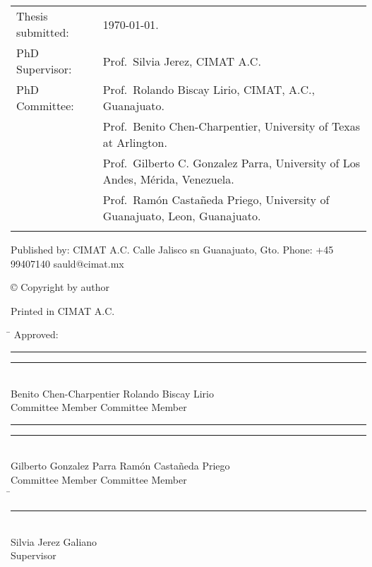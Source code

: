 \thispagestyle{empty}
\noindent
\begin{tabularx}{\textwidth}{@{}lX}
    Thesis submitted:	& \today.\\
    PhD Supervisor:		& Prof.\ Silvia Jerez, CIMAT A.C.\\
    PhD Committee:		& Prof.\ Rolando Biscay Lirio, CIMAT, A.C., Guanajuato. \\
					    & Prof.\ Benito Chen-Charpentier, University of Texas at Arlington.\\
					    & Prof.\ Gilberto C. Gonzalez Parra,
					    University of Los Andes, M\'erida, Venezuela.\\						
						& Prof.\ Ram\'on Casta\~{n}eda Priego, University of Guanajuato, Leon, Guanajuato.\\
						 \\
\end{tabularx}
\strut\vfill
\noindent
	\noindent Published by:\newline
	CIMAT A.C. \newline
	Calle Jalisco sn\newline
	Guanajuato, Gto.\newline
	Phone: +45 99407140\newline
	sauld@cimat.mx\newline
	\strut\vfill
	\noindent \copyright{} Copyright by author\newline
	\strut\vfill
	\noindent Printed in CIMAT A.C. 
	\strut\vfill\vfill\vfill
	\clearpage

\begin{tabbing}
	\mbox{\hspace{95mm}}\= \kill
	\huge{Approved}: \\[1.5in]
	\rule{60mm}{.1mm}          \> \rule{60mm}{.1mm}    \\
	Benito Chen-Charpentier     \>  Rolando Biscay Lirio           \\
	Committee Member           \>  Committee Member    \\[1.5in]	
	\rule{60mm}{.1mm}          \>  \rule{60mm}{.1mm}   \\
	Gilberto Gonzalez Parra    \>  Ramón Castañeda Priego \\
	Committee Member           \>  Committee Member\\  [1.5in]
	\mbox{\hspace{47mm}}\= \kill
	\> \rule{60mm}{.1mm}\\
	\> Silvia Jerez Galiano
	\\  
	\>Supervisor \\[.2in]
\end{tabbing}
